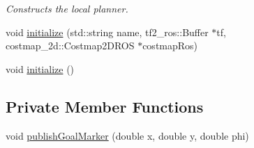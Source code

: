 \begin{DoxyCompactItemize}
\begin{DoxyCompactList}\small\item\em Constructs the local planner. \end{DoxyCompactList}\item 
void \hyperlink{classmove__base__z__client_1_1forward__local__planner_1_1ForwardLocalPlanner_af25eaf2a889236efde7248d16fdd73c5}{initialize} (std\+::string name, tf2\+\_\+ros\+::\+Buffer $\ast$tf, costmap\+\_\+2d\+::\+Costmap2\+D\+R\+OS $\ast$costmap\+Ros)
\item 
void \hyperlink{classmove__base__z__client_1_1forward__local__planner_1_1ForwardLocalPlanner_a22add5a4eadd578341cabd55f2cd5c64}{initialize} ()
\end{DoxyCompactItemize}
\subsection*{Private Member Functions}
\begin{DoxyCompactItemize}
\item 
void \hyperlink{classmove__base__z__client_1_1forward__local__planner_1_1ForwardLocalPlanner_a75346bffc10020b4b2af26835039990a}{publish\+Goal\+Marker} (double x, double y, double phi)
\end{DoxyCompactItemize}
